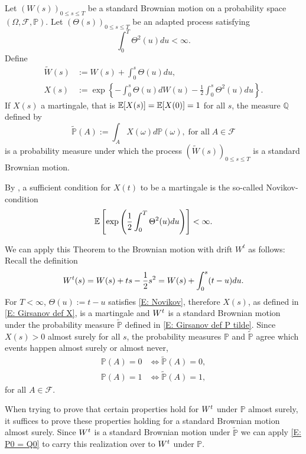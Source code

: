 \begin{theorem} \label{T: Girsanov}
	Let $(W(s))_{0 \leq s \leq T}$ be a standard Brownian motion on a probability space $(\Omega, \mathcal{F}, \mathbb{P})$.
	Let $(\Theta(s))_{0 \leq s \leq T}$ be an adapted process satisfying
	\begin{equation} \label{E: Girsanov cond Theta}
	\int_{0}^{T} \Theta^2(u)du < \infty.
	\end{equation}
	Define
	\begin{align}
	\tilde{W}(s) &:= W(s) + \int_0^s \Theta(u)du, \label{E: Girsanov def W tilde} \\ 
	X(s) &:= \exp \left\{ -\int_{0}^{s} \Theta(u) dW(u) - \frac{1}{2} \int_0^s \Theta^2(u)du \right\}. \label{E: Girsanov def X}
	\end{align}
	If $X(s)$ a martingale, that is $\mathbb{E}[X(s)] = \mathbb{E}[X(0)] = 1$ for all $s$,
	the measure $\mathbb{Q}$ defined by
	\begin{equation} \label{E: Girsanov def P tilde}
	\tilde{\mathbb{P}}(A) := \int_A X(\omega) d\mathbb{P}(\omega), \; \text{for all} \; A \in \mathcal{F}
	\end{equation}
	is a probability measure under which the process 
	$(\tilde{W}(s))_{0 \leq s \leq T}$
	is a standard Brownian motion.
\end{theorem}

By \cite[Remark 4.2.3, p.66]{Lamberton.2000}, a sufficient condition for $X(t)$ to be a martingale is the so-called Novikov-condition
\begin{equation} \label{E: Novikov}
\mathbb{E} \left[  \exp \left( \frac{1}{2} \int_{0}^{T} \Theta^2(u)du \right)  \right] < \infty.
\end{equation}

We can apply this Theorem to the Brownian motion with drift $W^t$ as follows:
Recall the definition
\begin{equation}
W^t(s) = W(s) + ts - \frac{1}{2} s^2 = W(s) + \int_0^s (t-u)du.
\end{equation}
For $T<\infty$, $\Theta(u) := t-u$ satisfies \eqref{E: Novikov},
therefore $X(s)$, as defined in \eqref{E: Girsanov def X}, is a martingale and
$W^t$ is a standard Brownian motion under the probability measure $\tilde{\mathbb{P}}$ defined in \eqref{E: Girsanov def P tilde}.
Since $X(s) > 0$ almost surely for all $s$, 
the probability measures $\mathbb{P}$ and $\tilde{\mathbb{P}}$ agree which events happen almost surely or almost never,
\begin{equation} \label{E: P0 = Q0}
\begin{aligned}
\mathbb{P}(A) = 0 &\iff \tilde{\mathbb{P}}(A) = 0, \\
\mathbb{P}(A) = 1 &\iff \tilde{\mathbb{P}}(A) = 1,
\end{aligned}
\end{equation}
for all $A \in \mathcal{F}$.

When trying to prove that certain properties hold for $W^t$ under $\mathbb{P}$ almost surely,
it suffices to prove these properties holding for a standard Brownian motion almost surely.
Since $W^t$ is a standard Brownian motion under $\tilde{\mathbb{P}}$ we can apply \eqref{E: P0 = Q0}
to carry this realization over to $W^t$ under $\mathbb{P}$.
